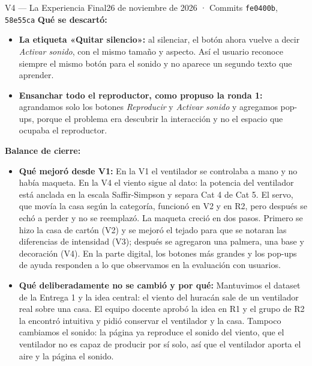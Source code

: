 \documentclass[11pt,a4paper]{article}
\begin{document}
\begin{versionbox}{V4 — La Experiencia Final}{26 de noviembre de 2026 · Commits \texttt{fe0400b}, \texttt{58e55ca}}
		\vspace{0.15cm}
		\noindent\textbf{Qué se descartó:}
		\begin{itemize}
			\item \textbf{La etiqueta «Quitar silencio»:} al silenciar, el botón ahora vuelve a decir \textit{Activar sonido}, con el mismo tamaño y aspecto. Así el usuario reconoce siempre el mismo botón para el sonido y no aparece un segundo texto que aprender.
			\item \textbf{Ensanchar todo el reproductor, como propuso la ronda 1:} agrandamos solo los botones \textit{Reproducir} y \textit{Activar sonido} y agregamos pop-ups, porque el problema era descubrir la interacción y no el espacio que ocupaba el reproductor.
		\end{itemize}

		\vspace{0.15cm}
		\noindent\textbf{Balance de cierre:}
		\begin{itemize}
			\item \textbf{Qué mejoró desde V1:} En la V1 el ventilador se controlaba a mano y no había maqueta. En la V4 el viento sigue al dato: la potencia del ventilador está anclada en la escala Saffir-Simpson y separa Cat 4 de Cat 5. El servo, que movía la casa según la categoría, funcionó en V2 y en R2, pero después se echó a perder y no se reemplazó. La maqueta creció en dos pasos. Primero se hizo la casa de cartón (V2) y se mejoró el tejado para que se notaran las diferencias de intensidad (V3); después se agregaron una palmera, una base y decoración (V4). En la parte digital, los botones más grandes y los pop-ups de ayuda responden a lo que observamos en la evaluación con usuarios.
			\item \textbf{Qué deliberadamente no se cambió y por qué:} Mantuvimos el dataset de la Entrega 1 y la idea central: el viento del huracán sale de un ventilador real sobre una casa. El equipo docente aprobó la idea en R1 y el grupo de R2 la encontró intuitiva y pidió conservar el ventilador y la casa. Tampoco cambiamos el sonido: la página ya reproduce el sonido del viento, que el ventilador no es capaz de producir por sí solo, así que el ventilador aporta el aire y la página el sonido.
		\end{itemize}
	\end{versionbox}

	\vspace{0.4cm}

\end{document}
